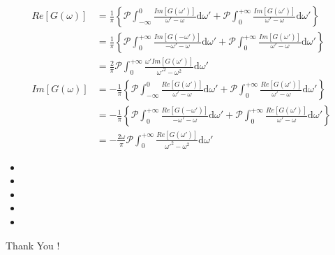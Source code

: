 \documentclass{beamer}
\begin{document}
\begin{frame}{}{}
\[\begin{split}
Re\left[G(\omega)\right]&=\frac{1}{\pi} \left\{ \mathcal{P}\int_{-\infty}^{0}\frac{Im\left[G(\omega')\right]}{\omega'-\omega}\mathrm{d}\omega' + \mathcal{P}\int_{0}^{+\infty}\frac{Im\left[G(\omega')\right]}{\omega'-\omega}\mathrm{d}\omega' \right\} \\
&=\frac{1}{\pi} \left\{ \mathcal{P}\int_{0}^{+\infty}\frac{Im\left[G(-\omega')\right]}{-\omega'-\omega}\mathrm{d}\omega' + \mathcal{P}\int_{0}^{+\infty}\frac{Im\left[G(\omega')\right]}{\omega'-\omega}\mathrm{d}\omega' \right\} \\
&= \frac{2}{\pi} \mathcal{P}\int_{0}^{+\infty}\frac{\omega' Im\left[G(\omega')\right]}{\omega'^{2}-\omega^{2}}\mathrm{d}\omega'
\\
Im\left[G(\omega)\right]&=-\frac{1}{\pi} \left\{ \mathcal{P}\int_{-\infty}^{0}\frac{Re\left[G(\omega')\right]}{\omega'-\omega}\mathrm{d}\omega' + \mathcal{P}\int_{0}^{+\infty}\frac{Re\left[G(\omega')\right]}{\omega'-\omega}\mathrm{d}\omega' \right\} \\
&=-\frac{1}{\pi} \left\{ \mathcal{P}\int_{0}^{+\infty}\frac{Re\left[G(-\omega')\right]}{-\omega'-\omega}\mathrm{d}\omega' + \mathcal{P}\int_{0}^{+\infty}\frac{Re\left[G(\omega')\right]}{\omega'-\omega}\mathrm{d}\omega' \right\} \\
&=-\frac{2\omega}{\pi}\mathcal{P}\int_{0}^{+\infty}\frac{Re\left[G(\omega')\right]}{\omega'^{2}-\omega^{2}}\mathrm{d}\omega'
\end{split}\]
\end{frame}



\begin{frame}{}{}
\end{frame}

\begin{frame}{}{}
    \begin{itemize}
        \item 
        \item 
        \item 
        \item 
        \item 
    \end{itemize}
\end{frame}




\begin{frame}
    \Huge
    \begin{center}
        Thank You !
    \end{center}
\end{frame}
\end{document}
